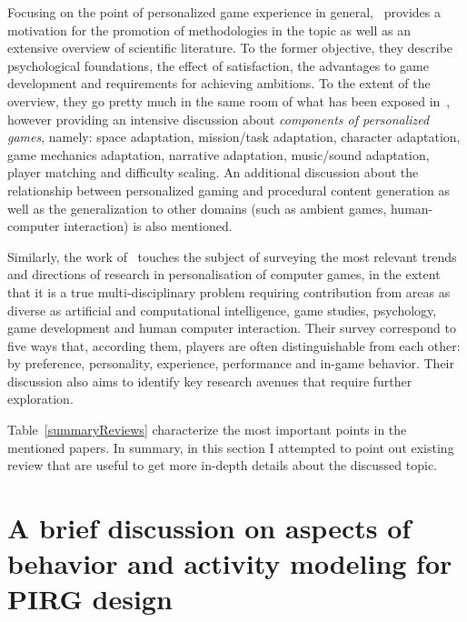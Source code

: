 Focusing on the point of personalized game experience in general,~\cite{bakkes2012personalised} provides a motivation for the promotion of methodologies in the topic as well as an extensive overview of scientific literature. To the former objective, they describe psychological foundations, the effect of satisfaction, the advantages to game development and requirements for achieving ambitions. To the extent of the overview, they go pretty much in the same room of what has been exposed in~\cite{bakkes2012player}, however providing an intensive discussion about \textit{components of personalized games}, namely: space adaptation, mission/task adaptation, character adaptation, game mechanics adaptation, narrative adaptation, music/sound adaptation, player matching and difficulty scaling. An additional discussion about the relationship between personalized gaming and procedural content generation as well as the generalization to other domains (such as ambient games, human-computer interaction) is also mentioned.

Similarly, the work of~\cite{Karpinskyj2014211} touches the subject of surveying the most relevant trends and directions of research in personalisation of computer games, in the extent that it is a true multi-disciplinary problem requiring contribution from areas as diverse as artificial and computational intelligence, game studies, psychology, game development and human computer interaction. Their survey correspond to five ways that, according them, players are often distinguishable from each other: by preference, personality, experience, performance and in-game behavior. Their discussion also aims to identify key research avenues that require further exploration.  

Table~\ref{summaryReviews} characterize the most important points in the mentioned papers. In summary, in this section I attempted to point out existing review that are useful to get more in-depth details about the discussed topic.

\section{A brief discussion on aspects of behavior and activity modeling for PIRG design}\label{DDA}

